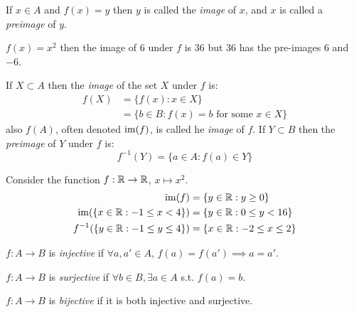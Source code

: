 \documentclass[../main.tex]{subfiles}
\begin{document}
\begin{definition}
  If $x \in A$ and $f(x) = y$ then $y$ is called the \textit{image} of $x$, and $x$ is called a \textit{preimage} of $y$.
\end{definition}
\begin{example}
  $f(x) = x^2$ then the image of $6$ under $f$ is $36$ but $36$ has the pre-images $6$ and $-6$.
\end{example}
If $X \subset A$ then the \textit{image} of the set $X$ under $f$ is:
\begin{align*}
  f(X) &= \{f(x): x \in X\} \\
       &= \{b \in B: f(x) = b \text{ for some } x \in X\}
\end{align*}
also $f(A)$, often denoted $\operatorname{im}(f)$, is called he \textit{image} of $f$.
If $Y \subset B$ then the \textit{preimage} of $Y$ under $f$ is:
\[
  f^{-1}(Y) = \{a \in A: f(a) \in Y\}
\]
\begin{example}
  Consider the function $f: \mathbb{R} \to \mathbb{R}$, $x \mapsto x^2$.
  \begin{align*}
    \operatorname{im}(f) &= \{y \in \mathbb{R}: y\geq0\} \\
    \operatorname{im}(\{x \in \mathbb{R}: -1 \leq x < 4\}) &= \{y \in \mathbb{R}: 0 \leq y < 16\} \\
    f^{-1}(\{y \in \mathbb{R}: -1 \leq y \leq 4\}) &= \{x \in \mathbb{R}: -2 \leq x \leq 2\}
  \end{align*}
\end{example}
\begin{definition}[Injective]
  $f:A \to B$ is \textit{injective} if $\forall a, a' \in A$, $f(a) = f(a') \implies a = a'$.
\end{definition}
\begin{definition}[Surjective]
  $f: A \to B$ is \textit{surjective} if $\forall b \in B, \exists a \in A$ s.t. $f(a) = b$.
\end{definition}
\begin{definition}[Bijective]
  $f: A \to B$ is \textit{bijective} if it is both injective and surjective.
\end{definition}
\end{document}
